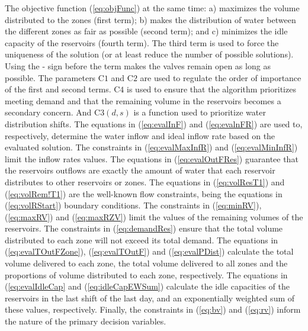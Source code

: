 \documentclass{singlecol}
\theoremstyle{TH}{
\newtheorem{lemma}{Lemma}
\newtheorem{theorem}[lemma]{Theorem}
\newtheorem{corrolary}[lemma]{Corrolary}
\newtheorem{conjecture}[lemma]{Conjecture}
\newtheorem{proposition}[lemma]{Proposition}
\newtheorem{claim}[lemma]{Claim}
\newtheorem{stheorem}[lemma]{Wrong Theorem}
\newtheorem{algorithm}{Algorithm}
}
\theoremstyle{THrm}{
\newtheorem{definition}{Definition}[section]
\newtheorem{question}{Question}[section]
\newtheorem{remark}{Remark}
\newtheorem{scheme}{Scheme}
}
\theoremstyle{THhit}{
\newtheorem{case}{Case}[section]
}
\begin{document}
The objective function (\ref{eq:objFunc}) at the same time: a) maximizes the volume distributed to the zones (first term); b) makes the distribution of water between the different zones as fair as possible (second term); and c) minimizes the idle capacity of the reservoirs (fourth term). The third term is used to force the uniqueness of the solution (or at least reduce the number of possible solutions). Using the - sign before the term makes the valves \footnotemark[1] remain open as long as possible. The parameters $\mathrm{C1}$ and $\mathrm{C2}$ are used to regulate the order of importance of the first and second terms. $\mathrm{C4}$ is used to ensure that the algorithm prioritizes meeting demand and that the remaining volume in the reservoirs becomes a secondary concern. And $\mathrm{C3}(d,s)$ is a function used to prioritize water distribution shifts. The equations in (\ref{eq:evalInF}) and (\ref{eq:evalnFR}) are used to, respectively, determine the water inflow and ideal inflow rate based on the evaluated solution. The constraints in (\ref{eq:evalMaxInfR}) and (\ref{eq:evalMinInfR}) limit the inflow rates values. The equations in (\ref{eq:evalOutFRes}) guarantee that the reservoirs outflows are exactly the amount of water that each reservoir distributes to other reservoirs or zones\footnotemark[2] . The equations in (\ref{eq:volResT1}) and (\ref{eq:volRem!T1}) are the well-known flow constraints, being the equations in (\ref{eq:volRStart}) boundary conditions. The constraints in (\ref{eq:minRV}), (\ref{eq:maxRV}) and (\ref{eq:maxRZV}) limit the values of the remaining volumes of the reservoirs. The constraints in (\ref{eq:demandRes}) ensure that the total volume distributed to each zone will not exceed its total demand. The equations in (\ref{eq:evalTOutFZone}), (\ref{eq:evalTOutF}) and (\ref{eq:evalPDist}) calculate the total volume delivered to each zone, the total volume delivered to all zones and the proportions of volume distributed to each zone, respectively. The equations in (\ref{eq:evalIdleCap} and (\ref{eq:idleCapEWSum}) calculate the idle capacities of the reservoirs in the last shift of the last day, and an exponentially weighted sum of these values, respectively. Finally, the constraints in (\ref{eq:bv}) and (\ref{eq:rv}) inform the nature of the primary decision variables.
\end{document}
